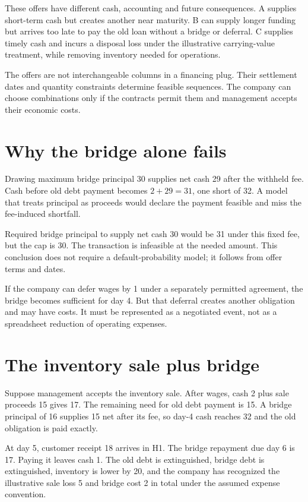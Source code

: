 These offers have different cash, accounting and future consequences. A supplies short-term cash but creates another near maturity. B can supply longer funding but arrives too late to pay the old loan without a bridge or deferral. C supplies timely cash and incurs a disposal loss under the illustrative carrying-value treatment, while removing inventory needed for operations.

The offers are not interchangeable columns in a financing plug. Their settlement dates and quantity constraints determine feasible sequences. The company can choose combinations only if the contracts permit them and management accepts their economic costs.

\section{Why the bridge alone fails}
Drawing maximum bridge principal 30 supplies net cash 29 after the withheld fee. Cash before old debt payment becomes $2+29=31$, one short of 32. A model that treats principal as proceeds would declare the payment feasible and miss the fee-induced shortfall.

Required bridge principal to supply net cash 30 would be 31 under this fixed fee, but the cap is 30. The transaction is infeasible at the needed amount. This conclusion does not require a default-probability model; it follows from offer terms and dates.

If the company can defer wages by 1 under a separately permitted agreement, the bridge becomes sufficient for day 4. But that deferral creates another obligation and may have costs. It must be represented as a negotiated event, not as a spreadsheet reduction of operating expenses.

\section{The inventory sale plus bridge}
Suppose management accepts the inventory sale. After wages, cash 2 plus sale proceeds 15 gives 17. The remaining need for old debt payment is 15. A bridge principal of 16 supplies 15 net after its fee, so day-4 cash reaches 32 and the old obligation is paid exactly.

At day 5, customer receipt 18 arrives in H1. The bridge repayment due day 6 is 17. Paying it leaves cash 1. The old debt is extinguished, bridge debt is extinguished, inventory is lower by 20, and the company has recognized the illustrative sale loss 5 and bridge cost 2 in total under the assumed expense convention.

